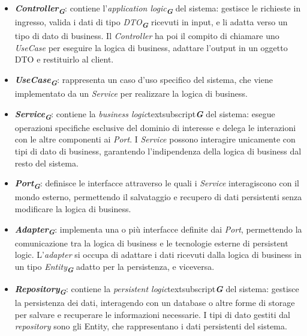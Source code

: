 \begin{itemize}
    \item \textbf{\emph{Controller}}\textsubscript{\textbf{\textit{G}}}: contiene l'\emph{application logic}\textsubscript{\textbf{\textit{G}}} del sistema: gestisce le richieste in ingresso, valida i dati di tipo \emph{DTO}\textsubscript{\textbf{\textit{G}}} ricevuti in input, e li adatta verso un tipo di dato di business. Il \emph{Controller} ha poi il compito di chiamare uno \emph{UseCase} per eseguire la logica di business, adattare l'output in un oggetto DTO e restituirlo al client.
    \item \textbf{\emph{UseCase}}\textsubscript{\textbf{\textit{G}}}: rappresenta un caso d'uso specifico del sistema, che viene implementato da un \emph{Service} per realizzare la logica di business.
    \item \textbf{\emph{Service}}\textsubscript{\textbf{\textit{G}}}: contiene la \emph{business logic}textsubscript{\textbf{\textit{G}}} del sistema: esegue operazioni specifiche esclusive del dominio di interesse e delega le interazioni con le altre componenti ai \emph{Port}. I \emph{Service} possono interagire unicamente con tipi di dato di business, garantendo l'indipendenza della logica di business dal resto del sistema.
    \item \textbf{\emph{Port}}\textsubscript{\textbf{\textit{G}}}: definisce le interfacce attraverso le quali i \emph{Service} interagiscono con il mondo esterno, permettendo il salvataggio e recupero di dati persistenti senza modificare la logica di business.
    \item \textbf{\emph{Adapter}}\textsubscript{\textbf{\textit{G}}}: implementa una o più interfacce definite dai \emph{Port}, permettendo la comunicazione tra la logica di business e le tecnologie esterne di persistent logic. L'\emph{adapter} si occupa di adattare i dati ricevuti dalla logica di business in un tipo \emph{Entity}\textsubscript{\textbf{\textit{G}}} adatto per la persistenza, e viceversa.
    \item \textbf{\emph{Repository}}\textsubscript{\textbf{\textit{G}}}: contiene la \emph{persistent logic}textsubscript{\textbf{\textit{G}}} del sistema: gestisce la persistenza dei dati, interagendo con un database o altre forme di storage per salvare e recuperare le informazioni necessarie. I tipi di dato gestiti dal \emph{repository} sono gli Entity, che rappresentano i dati persistenti del sistema.
\end{itemize}


